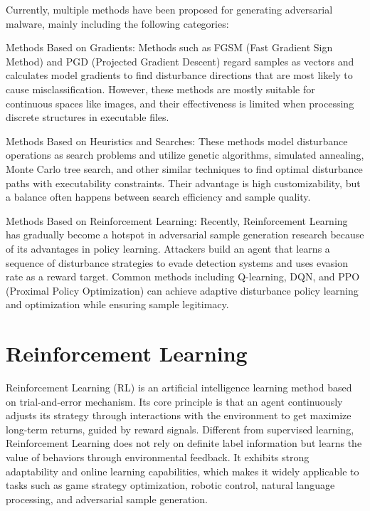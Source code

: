 Currently, multiple methods have been proposed for generating adversarial malware, mainly including the following categories:

Methods Based on Gradients: Methods such as FGSM\cite{lupart2023study} (Fast Gradient Sign Method) and PGD\cite{bryniarski2021evading} (Projected Gradient Descent) regard samples as vectors and calculates model gradients to find disturbance directions that are most likely to cause misclassification. However, these methods are mostly suitable for continuous spaces like images, and their effectiveness is limited when processing discrete structures in executable files.


Methods Based on Heuristics and Searches: These methods model disturbance operations as search problems and utilize genetic algorithms\cite{wang2022black}, simulated annealing\cite{bertsimas1993simulated}, Monte Carlo tree search\cite{chaslot2010monte}, and other similar techniques to find optimal disturbance paths with executability constraints. Their advantage is high customizability, but a balance often happens between search efficiency and sample quality.

Methods Based on Reinforcement Learning: Recently, Reinforcement Learning has gradually become a hotspot in adversarial sample generation research because of its advantages in policy learning. Attackers build an agent that learns a sequence of disturbance strategies to evade detection systems and uses evasion rate as a reward target. Common methods including Q-learning\cite{watkins1992q}, DQN\cite{osband2016deep}, and PPO \cite{yu2022surprising}(Proximal Policy Optimization) can achieve adaptive disturbance policy learning and optimization while ensuring sample legitimacy.

\section{Reinforcement Learning}

Reinforcement Learning (RL) is an artificial intelligence learning method based on trial-and-error mechanism. Its core principle is that an agent continuously adjusts its strategy through interactions with the environment to get maximize long-term returns, guided by reward signals. Different from supervised learning, Reinforcement Learning does not rely on definite label information but learns the value of behaviors through environmental feedback. It exhibits strong adaptability and online learning capabilities, which makes it widely applicable to tasks such as game strategy optimization, robotic control, natural language processing, and adversarial sample generation.

